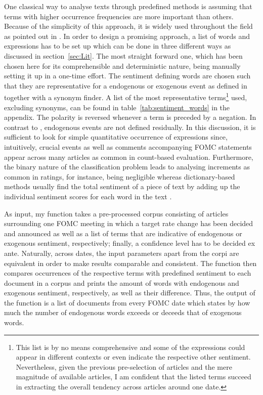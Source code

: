 One classical way to analyse texts through predefined methods is assuming that terms with higher occurrence frequencies are more important than others. Because of the simplicity of this approach, it is widely used throughout the field as pointed out in \textcite{Meyer.2008}. In order to design a promising approach, a list of words and expressions has to be set up which can be done in three different ways as discussed in section~\ref{sec:Lit}. The most straight forward one, which has been chosen here for its comprehensible and deterministic nature, being manually setting it up in a one-time effort. The sentiment defining words are chosen such that they are representative for a endogenous or exogenous event as defined in \textcite{Ellingsen.2003} together with a synonym finder. A list of the most representative terms\footnote{This list is by no means comprehensive and some of the expressions could appear in different contexts or even indicate the respective other sentiment. Nevertheless, given the previous pre-selection of articles and the mere magnitude of available articles, I am confident that the listed terms succeed in extracting the overall tendency across articles around one date.} used, excluding synonyms, can be found in table~\vref{tab:sentiment_words} in the appendix. The polarity is reversed whenever a term is preceded by a negation. In contrast to \textcite{Ellingsen.2003}, endogenous events are not defined residually.
In this discussion, it is sufficient to look for simple quantitative occurrence of expressions since, intuitively, crucial events as well as comments accompanying FOMC statements appear across many articles as common in count-based evaluation. Furthermore, the binary nature of the classification problem leads to analysing increments as common in ratings, for instance, being negligible whereas dictionary-based methods usually find the total sentiment of a piece of text by adding up the individual sentiment scores for each word in the text \parencite{Silge.2017}. 

As input, my function takes a pre-processed corpus consisting of articles surrounding one FOMC meeting in which a target rate change has been decided and announced as well as a list of terms that are indicative of endogenous or exogenous sentiment, respectively; finally, a confidence level has to be decided ex ante. Naturally, across dates, the input parameters apart from the corpi are equivalent in order to make results comparable and consistent. The function then compares occurrences of the respective terms with predefined sentiment to each document in a corpus and prints the amount of words with endogenous and exogenous sentiment, respectively, as well as their difference. Thus, the output of the function is a list of documents from every FOMC date which states by how much the number of endogenous words exceeds or deceeds that of exogenous words. 

